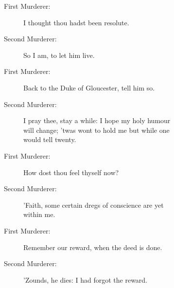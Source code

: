 \documentclass{article}
\begin{document}
\begin{description}
\item[First Murderer:] 
\hspace{1pt}I thought thou hadst been resolute.\\
\end{description}
\begin{description}
\item[Second Murderer:] 
\hspace{1pt}So I am, to let him live.\\
\end{description}
\begin{description}
\item[First Murderer:] 
\hspace{1pt}Back to the Duke of Gloucester, tell him so.\\
\end{description}
\begin{description}
\item[Second Murderer:] 
\hspace{1pt}I pray thee, stay a while: I hope my holy humour\\
\hspace{1pt}will change; 'twas wont to hold me but while one\\
\hspace{1pt}would tell twenty.\\
\end{description}
\begin{description}
\item[First Murderer:] 
\hspace{1pt}How dost thou feel thyself now?\\
\end{description}
\begin{description}
\item[Second Murderer:] 
\hspace{1pt}'Faith, some certain dregs of conscience are yet\\
\hspace{1pt}within me.\\
\end{description}
\begin{description}
\item[First Murderer:] 
\hspace{1pt}Remember our reward, when the deed is done.\\
\end{description}
\begin{description}
\item[Second Murderer:] 
\hspace{1pt}'Zounds, he dies: I had forgot the reward.\\
\end{description}
\end{document}
